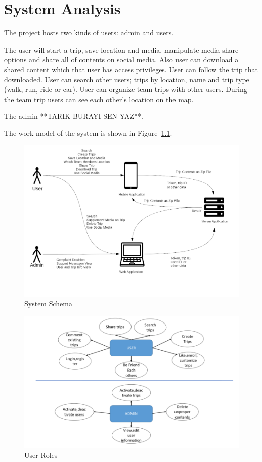 \chapter{System Analysis}

The project hosts two kinds of users: admin and users. 

The user will start a trip, save location and media, manipulate media share options and share all of contents on social media. Also user can download a shared content which that user has access privileges. User can follow the trip that downloaded. User can search other users; trips by location, name and trip type (walk, run, ride or car). User can organize team trips with other users. During the team trip users can see each other's location on the map.

The admin **TARIK BURAYI SEN YAZ**.

The work model of the system is shown in Figure~\ref{fig:system_diagram}.

\begin{figure}[!htbp]
\centering
\includegraphics[width=\textwidth]{projectChapters/images/system_diagram.png}
\caption{System Schema}
\label{fig:system_diagram}
\end{figure}

\begin{figure}[!htbp]
\centering
\includegraphics[width=\textwidth]{projectChapters/images/ER.png}
\caption{User Roles}
\label{fig:roles}
\end{figure}